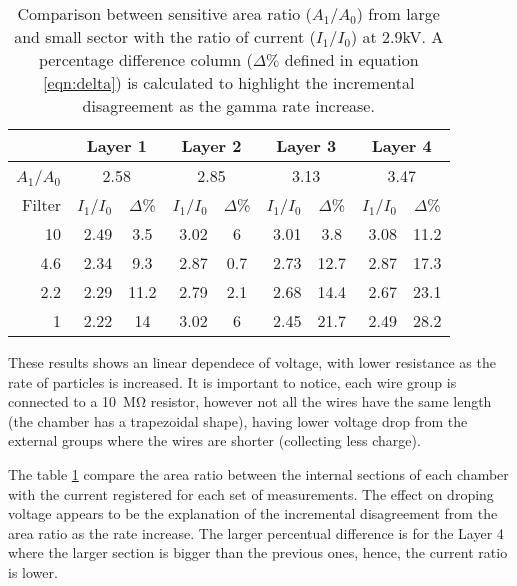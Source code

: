 	\begin{table}[ht]\footnotesize
		\centering
		\begin{tabular*}{0.7\textwidth}{rrcrcrcrc}
		 & \multicolumn{2}{c}{Layer 1} &\multicolumn{2}{c}{ Layer 2} &\multicolumn{2}{c}{ Layer 3
		}&\multicolumn{2}{c}{Layer 4}\\
		\hline
		$A_1$/$A_0$&\multicolumn{2}{c}{2.58}&\multicolumn{2}{c}{ 2.85}&\multicolumn{2}{c}{ 3.13}&\multicolumn{2}{c}{3.47}\\
		Filter & $I_1$/$I_0$ & $\Delta$\%& $I_1$/$I_0$ & $\Delta$\%& $I_1$/$I_0$ &$\Delta$\%& $I_1$/$I_0$ & $\Delta$\%\\ 	
		\hline
		10 	&2.49 &3.5  &3.02 &6 		&3.01 &3.8 	&3.08	&11.2 \\
		4.6 &2.34	&9.3 	&2.87 &0.7	&2.73 &12.7 &2.87	&17.3 \\
		2.2	&2.29 &11.2 &2.79 &2.1	&2.68 &14.4 &2.67	&23.1 \\
		1		&2.22 &14 	&3.02 &6 		&2.45 &21.7 &2.49	&28.2 \\
		\hline
		\end{tabular*}
		\caption{Comparison between sensitive area ratio ($A_1$/$A_0$) from large and small sector with the ratio of current
		($I_1$/$I_0$) at 2.9kV. A percentage difference column ($\Delta \%$ defined in equation \ref{eqn:delta}) is calculated to
		highlight the incremental disagreement as the gamma rate increase.}\label{aratio}
	\end{table}
These results shows an linear dependece of voltage, with lower resistance as the rate of particles is increased. It is
important to notice, each wire group is connected to a \SI{10}{\mega\ohm} resistor, however not all the wires have the
same length (the chamber has a trapezoidal shape), having lower voltage drop from the external groups where the wires are shorter (collecting less
charge).\par
The table \ref{aratio} compare the area ratio between the internal sections of each chamber with the current registered
for each set of measurements. The effect on droping voltage appears to be the explanation of the incremental
	disagreement from the area ratio as the rate increase. The larger percentual difference is for the Layer 4 where the
	larger section is bigger than the previous ones, hence, the current ratio is lower.\par




